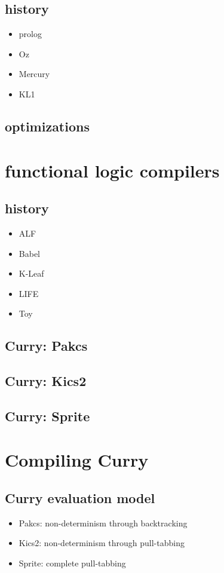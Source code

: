 \documentclass{article}
\begin{document}
\subsection{history}
\begin{itemize}
  \item prolog
  \item Oz
  \item Mercury
  \item KL1
\end{itemize}
\subsection{optimizations}
\section{functional logic compilers}
\subsection{history}
\begin{itemize}
  \item ALF
  \item Babel
  \item K-Leaf
  \item LIFE
  \item Toy
\end{itemize}
\subsection{Curry: Pakcs}
\subsection{Curry: Kics2}
\subsection{Curry: Sprite}
\section{Compiling Curry}
\subsection{Curry evaluation model}
\begin{itemize}
  \item Pakcs: non-determinism through backtracking
  \item Kics2: non-determinism through pull-tabbing
  \item Sprite: complete pull-tabbing
\end{itemize}
\end{document}

